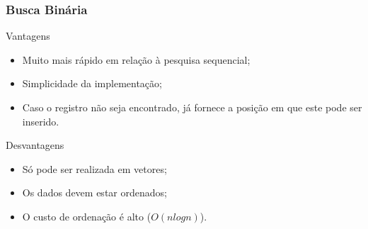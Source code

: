\documentclass[aspectratio=169]{beamer}
\begin{document}
\begin{frame}
\frametitle{Busca Binária}
  \begin{block}{Vantagens}
  \begin{itemize}
   \item Muito mais rápido em relação à pesquisa sequencial;
   \item Simplicidade da implementação;
   \item Caso o registro não seja encontrado, já fornece a posição em que este pode ser inserido.
  \end{itemize}
  \end{block}
  \begin{block}{Desvantagens}
  \begin{itemize}
   \item Só pode ser realizada em vetores;
   \item Os dados devem estar ordenados;
   \item O custo de ordenação é alto ($O(nlogn)$).
  \end{itemize}

  \end{block}
\end{frame}
\end{document}
